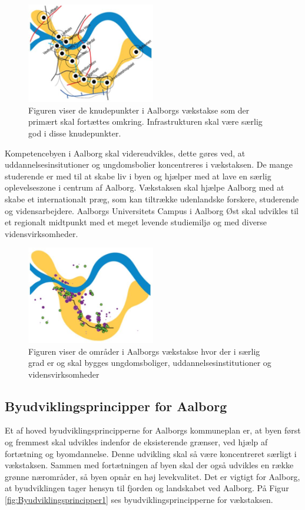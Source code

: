 \begin{figure}[H] 
\centering
\includegraphics[width=0.50\textwidth]{billeder/Vaekstakse3}
\caption{Figuren viser de knudepunkter i Aalborgs vækstakse som der primært skal fortættes omkring. Infrastrukturen skal være særlig god i disse knudepunkter.}
\label{fig:Vaekstakse3}
\end{figure}

Kompetencebyen i Aalborg skal videreudvikles, dette gøres ved, at uddannelsesinsitutioner og ungdomsbolier koncentreres i vækstaksen. De mange studerende er med til at skabe liv i byen og hjælper med at lave en særlig oplevelseszone i centrum af Aalborg. Vækstaksen skal hjælpe Aalborg med at skabe et internationalt præg, som kan tiltrække udenlandske forskere, studerende og vidensarbejdere. Aalborgs Universitets Campus i Aalborg Øst skal udvikles til et regionalt midtpunkt med et meget levende studiemiljø og med diverse vidensvirksomheder.


\begin{figure}[H] 
\centering
\includegraphics[width=0.50\textwidth]{billeder/Vaekstakse4}
\caption{Figuren viser de områder i Aalborgs vækstakse hvor der i særlig grad er og skal bygges ungdomsboliger, uddannelsesinstitutioner og vidensvirksomheder}
\label{fig:Vaekstakse4}
\end{figure}



\subsection{Byudviklingsprincipper for Aalborg}
Et af hoved byudviklingsprincipperne for Aalborgs kommuneplan er, at byen først og fremmest skal udvikles indenfor de eksisterende grænser, ved hjælp af fortætning og byomdannelse. Denne udvikling skal så være koncentreret særligt i vækstaksen. Sammen med fortætningen af byen skal der også udvikles en række grønne nærområder, så byen opnår en høj levekvalitet. Det er vigtigt for Aalborg, at byudviklingen tager hensyn til fjorden og landskabet ved Aalborg. På Figur \ref{fig:Byudviklingsprincipper1} ses byudviklingsprincipperne for vækstaksen.

